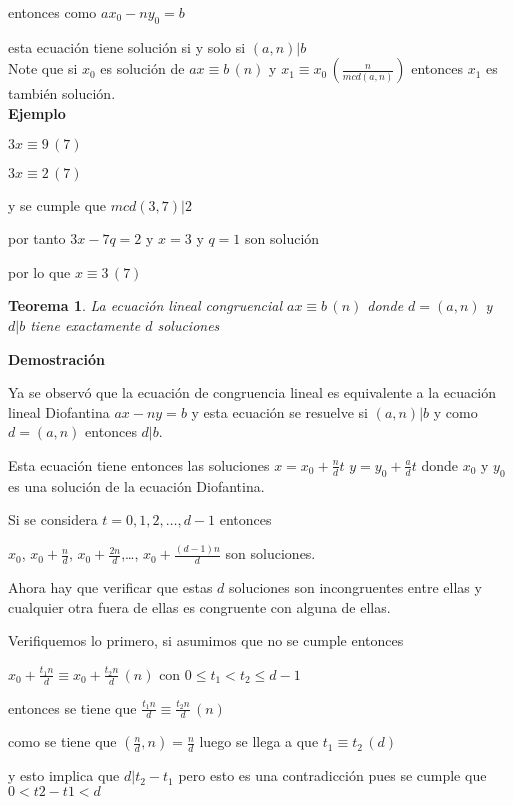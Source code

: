 \documentclass[a4paper,12pt]{report}
\newtheorem*{teo}{Teorema}
\begin{document}
entonces como $ax_0-ny_0=b$ 

esta ecuación tiene solución si y solo si $(a,n)|b$\\


Note que si $x_0$ es solución de  $ax\equiv b \, (n)$ y $x_1\equiv x_0\, (\frac{n}{mcd(a,n)})$ entonces $x_1$ es también solución.\\

\textbf{Ejemplo}

$3x\equiv 9\, (7)$

$3x\equiv 2\, (7)$

y se cumple que $mcd(3,7)|2$

por tanto $3x-7q=2$ y $x=3$ y $q=1$ son solución

por lo que $x\equiv 3\, (7)$



\begin{teo}
 La ecuación lineal congruencial $ax\equiv b \, (n)$ donde $d=(a,n)$ y $d|b$ tiene exactamente $d$ soluciones\\
\end{teo}



\textbf{Demostración}

Ya se observó que la ecuación de congruencia lineal es equivalente a la ecuación lineal Diofantina $ax-ny=b$ y esta ecuación se resuelve si $(a,n)|b$ y como $d=(a,n)$ entonces $d|b$.

Esta ecuación tiene entonces las soluciones $x=x_0 + \frac{n}{d}t$ $y=y_0 + \frac{a}{d}t$ donde $x_0$ y $y_0$ es una solución de la ecuación Diofantina.

Si se considera $t=0,1,2,\dots,d-1$ entonces 

$x_0$, $x_0 + \frac{n}{d}$, $x_0 + \frac{2n}{d}$,\dots, $x_0 + \frac{(d-1)n}{d}$ son soluciones.

Ahora hay que verificar que estas $d$ soluciones son incongruentes entre ellas y cualquier otra fuera de ellas es congruente con alguna de ellas.

Verifiquemos lo primero, si asumimos que no se cumple entonces 

$x_0 + \frac{t_1n}{d} \equiv x_0 + \frac{t_2n}{d} \, (n)$ con $0\leq t_1 < t_2 \leq d-1$

entonces se tiene que $\frac{t_1n}{d} \equiv \frac{t_2n}{d} \, (n)$

como se tiene que $(\frac{n}{d},n)=\frac{n}{d}$ luego se llega a que $t_1\equiv t_2 \, (d)$

y esto implica que $d|t_2-t_1$ pero esto es una contradicción pues se cumple que $0<t2-t1<d$
\end{document}
